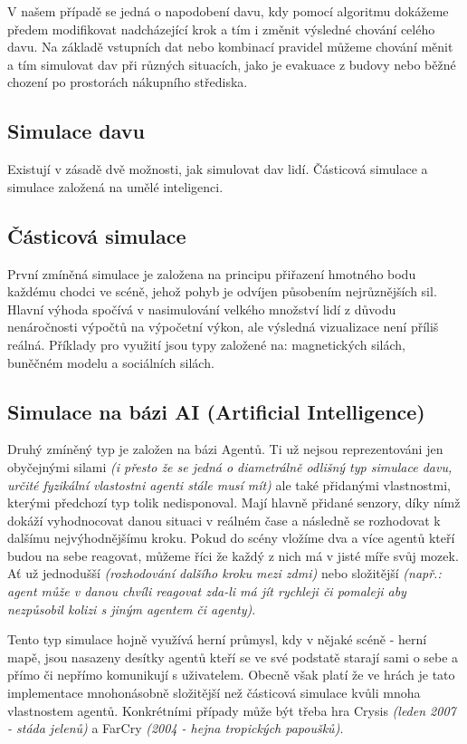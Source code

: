 \documentclass[czech,public,dept460,male,cpdeclaration]{diploma}
\begin{document}
V našem případě se jedná o napodobení davu, kdy pomocí algoritmu dokážeme předem modifikovat nadcházející krok a tím i změnit výsledné chování celého davu. Na základě vstupních dat nebo kombinací pravidel můžeme chování měnit a tím simulovat dav při různých situacích, jako je evakuace z budovy nebo běžné chození po prostorách nákupního střediska.

\subsection{Simulace davu}
Existují v zásadě dvě možnosti, jak simulovat dav lidí. Částicová simulace a simulace založená na umělé inteligenci. \cite{linkToBachelor1}

\subsection{Částicová simulace}
První zmíněná simulace je založena na principu přiřazení hmotného bodu každému chodci ve scéně, jehož pohyb je odvíjen působením nejrůznějších sil. Hlavní výhoda spočívá v nasimulování velkého množství lidí z důvodu nenáročnosti výpočtů na výpočetní výkon, ale výsledná vizualizace není příliš reálná. Příklady pro využití jsou typy založené na: magnetických silách, buněčném modelu a sociálních silách. \cite{linkToBachelor1}

\subsection{Simulace na bázi AI (Artificial Intelligence)}\label{sec:simulace-na-bazi-ai-artificial-intelligence}
Druhý zmíněný typ je založen na bázi Agentů. Ti už nejsou reprezentováni jen obyčejnými silami \textit{(i přesto že se jedná o diametrálně odlišný typ simulace davu, určité fyzikální vlastostni agenti stále musí mít)} ale také přidanými vlastnostmi, kterými předchozí typ tolik nedisponoval. Mají hlavně přidané senzory, díky nímž dokáží vyhodnocovat danou situaci v reálném čase a následně se rozhodovat k dalšímu nejvýhodnějšímu kroku. Pokud do scény vložíme dva a více agentů kteří budou na sebe reagovat, můžeme říci že každý z nich má v jisté míře svůj mozek. Ať už jednodušší \textit{(rozhodování dalšího kroku mezi zdmi)} nebo složitější \textit{(např.: agent může v danou chvíli reagovat zda-li má jít rychleji či pomaleji aby nezpůsobil kolizi s jiným agentem či agenty)}.

Tento typ simulace hojně využívá herní průmysl, kdy v nějaké scéně - herní mapě, jsou nasazeny desítky agentů kteří se ve své podstatě starají sami o sebe a přímo či nepřímo komunikují s uživatelem. Obecně však platí že ve hrách je tato implementace mnohonásobně složitější než částicová simulace kvůli mnoha vlastnostem agentů. Konkrétními případy může být třeba hra Crysis \textit{(leden 2007 - stáda jelenů)} a FarCry \textit{(2004 - hejna tropických papoušků)}.
\end{document}
